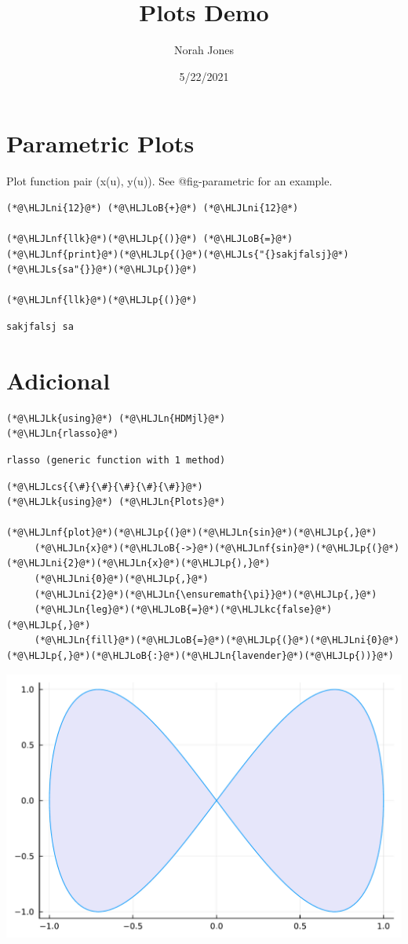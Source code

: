 \documentclass[12pt,a4paper]{article}
\title{ Plots Demo }
\author{ Norah Jones }
\date{ 5/22/2021 }
\newcommand{\HLJLk}[1]{\textcolor[RGB]{24,172,200}{#1}}
\newcommand{\HLJLkc}[1]{#1}
\newcommand{\HLJLn}[1]{#1}
\newcommand{\HLJLnf}[1]{\textcolor[RGB]{117,171,3}{#1}}
\newcommand{\HLJLs}[1]{\textcolor[RGB]{170,58,168}{#1}}
\newcommand{\HLJLni}[1]{#1}
\newcommand{\HLJLoB}[1]{\textcolor[RGB]{249,38,114}{#1}}
\newcommand{\HLJLp}[1]{#1}
\newcommand{\HLJLcs}[1]{#1}
\begin{document}
\maketitle

\section{Parametric Plots}
Plot function pair (x(u), y(u)).  See @fig-parametric for an example.


\begin{lstlisting}
(*@\HLJLni{12}@*) (*@\HLJLoB{+}@*) (*@\HLJLni{12}@*)

(*@\HLJLnf{llk}@*)(*@\HLJLp{()}@*) (*@\HLJLoB{=}@*) (*@\HLJLnf{print}@*)(*@\HLJLp{(}@*)(*@\HLJLs{"{}sakjfalsj}@*) (*@\HLJLs{sa"{}}@*)(*@\HLJLp{)}@*)

(*@\HLJLnf{llk}@*)(*@\HLJLp{()}@*)
\end{lstlisting}

\begin{lstlisting}
sakjfalsj sa
\end{lstlisting}


\section{Adicional}

\begin{lstlisting}
(*@\HLJLk{using}@*) (*@\HLJLn{HDMjl}@*)
(*@\HLJLn{rlasso}@*)
\end{lstlisting}

\begin{lstlisting}
rlasso (generic function with 1 method)
\end{lstlisting}


\begin{lstlisting}
(*@\HLJLcs{{\#}{\#}{\#}{\#}{\#}}@*)
(*@\HLJLk{using}@*) (*@\HLJLn{Plots}@*)

(*@\HLJLnf{plot}@*)(*@\HLJLp{(}@*)(*@\HLJLn{sin}@*)(*@\HLJLp{,}@*) 
     (*@\HLJLn{x}@*)(*@\HLJLoB{->}@*)(*@\HLJLnf{sin}@*)(*@\HLJLp{(}@*)(*@\HLJLni{2}@*)(*@\HLJLn{x}@*)(*@\HLJLp{),}@*) 
     (*@\HLJLni{0}@*)(*@\HLJLp{,}@*) 
     (*@\HLJLni{2}@*)(*@\HLJLn{\ensuremath{\pi}}@*)(*@\HLJLp{,}@*) 
     (*@\HLJLn{leg}@*)(*@\HLJLoB{=}@*)(*@\HLJLkc{false}@*)(*@\HLJLp{,}@*) 
     (*@\HLJLn{fill}@*)(*@\HLJLoB{=}@*)(*@\HLJLp{(}@*)(*@\HLJLni{0}@*)(*@\HLJLp{,}@*)(*@\HLJLoB{:}@*)(*@\HLJLn{lavender}@*)(*@\HLJLp{))}@*)
\end{lstlisting}

\includegraphics[width=\linewidth]{jl_SdKYyO/hdm_3_1.pdf}
\end{document}
